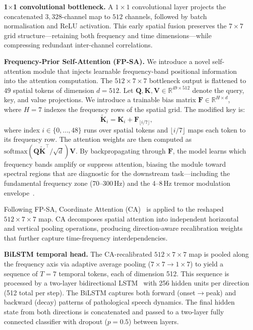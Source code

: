\documentclass[conference]{IEEEtran}
\begin{document}
\textbf{1$\times$1 convolutional bottleneck.} A $1\times1$ convolutional layer projects the concatenated $3{,}328$-channel map to $512$ channels, followed by batch normalisation and ReLU activation. This early spatial fusion preserves the $7\times 7$ grid structure---retaining both frequency and time dimensions---while compressing redundant inter-channel correlations.

\textbf{Frequency-Prior Self-Attention (FP-SA).} We introduce a novel self-attention module that injects learnable frequency-band positional information into the attention computation. The $512\times 7\times 7$ bottleneck output is flattened to $49$ spatial tokens of dimension $d=512$. Let $\mathbf{Q}, \mathbf{K}, \mathbf{V} \in \mathbb{R}^{49 \times 512}$ denote the query, key, and value projections. We introduce a trainable bias matrix $\mathbf{F} \in \mathbb{R}^{H \times d}$, where $H=7$ indexes the frequency rows of the spatial grid. The modified key is:
\begin{equation}
  \tilde{\mathbf{K}}_{i} = \mathbf{K}_{i} + \mathbf{F}_{\lfloor i / 7 \rfloor},
  \label{eq:fpsa}
\end{equation}
where index $i \in \{0, \ldots, 48\}$ runs over spatial tokens and $\lfloor i/7 \rfloor$ maps each token to its frequency row. The attention weights are then computed as $\text{softmax}(\mathbf{Q}\tilde{\mathbf{K}}^\top / \sqrt{d})\mathbf{V}$. By backpropagating through $\mathbf{F}$, the model learns which frequency bands amplify or suppress attention, biasing the module toward spectral regions that are diagnostic for the downstream task---including the fundamental frequency zone (70--300\,Hz) and the 4--8\,Hz tremor modulation envelope~\cite{rusz2011}.

Following FP-SA, Coordinate Attention (CA)~\cite{hou2021} is applied to the reshaped $512\times 7\times 7$ map. CA decomposes spatial attention into independent horizontal and vertical pooling operations, producing direction-aware recalibration weights that further capture time-frequency interdependencies.

\textbf{BiLSTM temporal head.} The CA-recalibrated $512\times 7\times 7$ map is pooled along the frequency axis via adaptive average pooling ($7\times 7 \rightarrow 1\times 7$) to yield a sequence of $T=7$ temporal tokens, each of dimension 512. This sequence is processed by a two-layer bidirectional LSTM~\cite{graves2005} with 256 hidden units per direction (512 total per step). The BiLSTM captures both forward (onset$\rightarrow$peak) and backward (decay) patterns of pathological speech dynamics. The final hidden state from both directions is concatenated and passed to a two-layer fully connected classifier with dropout ($p=0.5$) between layers.
\end{document}
